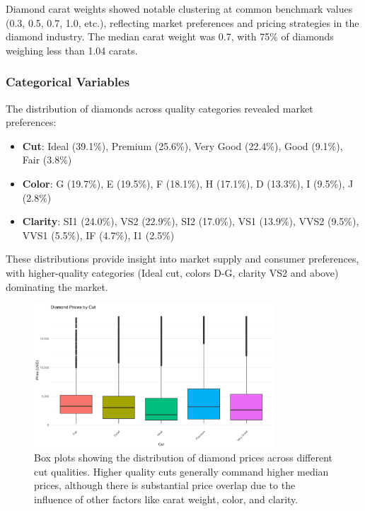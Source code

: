 \documentclass[11pt,a4paper]{article}
\begin{document}
Diamond carat weights showed notable clustering at common benchmark values (0.3, 0.5, 0.7, 1.0, etc.), reflecting market preferences and pricing strategies in the diamond industry. The median carat weight was 0.7, with 75\% of diamonds weighing less than 1.04 carats.

\subsubsection{Categorical Variables}

The distribution of diamonds across quality categories revealed market preferences:

\begin{itemize}
    \item \textbf{Cut}: Ideal (39.1\%), Premium (25.6\%), Very Good (22.4\%), Good (9.1\%), Fair (3.8\%)
    \item \textbf{Color}: G (19.7\%), E (19.5\%), F (18.1\%), H (17.1\%), D (13.3\%), I (9.5\%), J (2.8\%)
    \item \textbf{Clarity}: SI1 (24.0\%), VS2 (22.9\%), SI2 (17.0\%), VS1 (13.9\%), VVS2 (9.5\%), VVS1 (5.5\%), IF (4.7\%), I1 (2.5\%)
\end{itemize}

These distributions provide insight into market supply and consumer preferences, with higher-quality categories (Ideal cut, colors D-G, clarity VS2 and above) dominating the market.

\begin{figure}[H]
    \centering
    \includegraphics[width=0.8\textwidth]{price_by_cut_boxplot.png}
    \caption{Box plots showing the distribution of diamond prices across different cut qualities. Higher quality cuts generally command higher median prices, although there is substantial price overlap due to the influence of other factors like carat weight, color, and clarity.}
    \label{fig:price_by_cut}
\end{figure}
\end{document}
